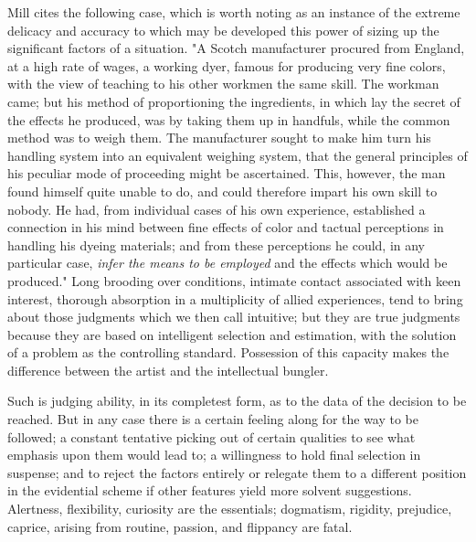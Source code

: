 \documentclass[letterpaper]{book}
\begin{document}

Mill cites the following case, which is worth noting as an instance of
the extreme delicacy and accuracy to which may be developed this power
of sizing up the significant factors of a situation. "A Scotch
manufacturer procured from England, at a high rate of wages, a working
dyer, famous for producing very fine colors, with the view of teaching
to his other workmen the
same
skill. The workman came; but his method of proportioning the
ingredients, in which lay the secret of the effects he produced, was by
taking them up in handfuls, while the common method was to weigh them.
The manufacturer sought to make him turn his handling system into an
equivalent weighing system, that the general principles of his peculiar
mode of proceeding might be ascertained. This, however, the man found
himself quite unable to do, and could therefore impart his own skill to
nobody. He had, from individual cases of his own experience, established
a connection in his mind between fine effects of color and tactual
perceptions in handling his dyeing materials; and from these perceptions
he could, in any particular case, \emph{infer the means to be employed}
and the effects which would be produced." Long brooding over conditions,
intimate contact associated with keen interest, thorough absorption in a
multiplicity of allied experiences, tend to bring about those judgments
which we then call intuitive; but they are true judgments because they
are based on intelligent selection and estimation, with the solution of
a problem as the controlling standard. Possession of this capacity makes
the difference between the artist and the intellectual bungler.

Such is judging ability, in its completest form, as to the data of the
decision to be reached. But in any case there is a certain feeling along
for the way to be followed; a constant tentative picking out of certain
qualities to see what emphasis upon them would lead to; a willingness to
hold final selection in suspense; and to reject the factors entirely or
relegate them to a different position in the evidential scheme if other
features yield more solvent suggestions. Alertness, flexibility,
curiosity
are the essentials; dogmatism, rigidity, prejudice, caprice, arising
from routine, passion, and flippancy are fatal.

\end{document}
